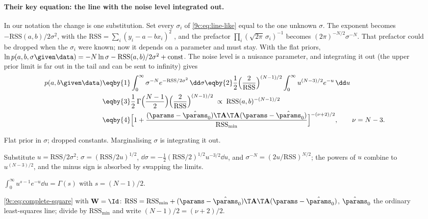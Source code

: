 \paragraph{Their key equation: the line with the noise level integrated out.} In our notation the
change is one substitution. Set every $\sigma_i$ of \eqref{9c:eq:line-like} equal to the one unknown
$\sigma$. The exponent becomes $-\mathrm{RSS}(a,b)/2\sigma^2$, with the 
$\mathrm{RSS}=\sum_i(y_i-a-bx_i)^2$ , and the
prefactor $\prod_i(\sqrt{2\pi}\,\sigma_i)^{-1}$ becomes $(2\pi)^{-N/2}\sigma^{-N}$. That prefactor could be
dropped when the $\sigma_i$ were known; now it depends on a parameter and must stay. With the flat priors,
$\ln p(a,b,\sigma\given\data)=-N\ln\sigma-\mathrm{RSS}(a,b)/2\sigma^2+\text{const}$. The noise level is a
nuisance parameter, and integrating it out (the upper prior limit is far out in the tail and can be sent to
infinity) gives
\begin{align}
  p(a,b\given\data)
  &\eqby{1}\int_0^\infty\sigma^{-N}e^{-\mathrm{RSS}/2\sigma^2}\,\dd\sigma
   \eqby{2}\frac12\Bigl(\frac{2}{\mathrm{RSS}}\Bigr)^{(N-1)/2}\int_0^\infty u^{(N-3)/2}e^{-u}\,\dd u
   \nonumber\\
  &\eqby{3}\frac12\,\Gamma\Bigl(\frac{N-1}{2}\Bigr)\Bigl(\frac{2}{\mathrm{RSS}}\Bigr)^{(N-1)/2}
   \;\propto\;\mathrm{RSS}(a,b)^{-(N-1)/2}
   \nonumber\\
  &\eqby{4}\Bigl[1+\frac{(\params-\hat\params_0)\T\mathbf A\T\mathbf A(\params-\hat\params_0)}{\mathrm{RSS}_{\min}}\Bigr]^{-(\nu+2)/2},
  \qquad \nu=N-3 .
  \label{9c:eq:line-student}
\end{align}
\begin{explain}
  \item Flat prior in $\sigma$; dropped constants. Marginalising $\sigma$ is integrating it out.
  \item Substitute $u=\mathrm{RSS}/2\sigma^2$: $\sigma=(\mathrm{RSS}/2u)^{1/2}$,
        $\dd\sigma=-\tfrac12(\mathrm{RSS}/2)^{1/2}u^{-3/2}\dd u$, and
        $\sigma^{-N}=(2u/\mathrm{RSS})^{N/2}$; the powers of $u$ combine to $u^{(N-3)/2}$, and the minus
        sign is absorbed by swapping the limits.
  \item $\int_0^\infty u^{s-1}e^{-u}\dd u=\Gamma(s)$ with $s=(N-1)/2$.
  \item \eqref{9c:eq:complete-square} with $\mathbf W=\Id$:
        $\mathrm{RSS}=\mathrm{RSS}_{\min}+(\params-\hat\params_0)\T\mathbf A\T\mathbf A(\params-\hat\params_0)$, $\hat\params_0$
        the ordinary least-squares line; divide by $\mathrm{RSS}_{\min}$ and write
        $(N-1)/2=(\nu+2)/2$.
\end{explain}
